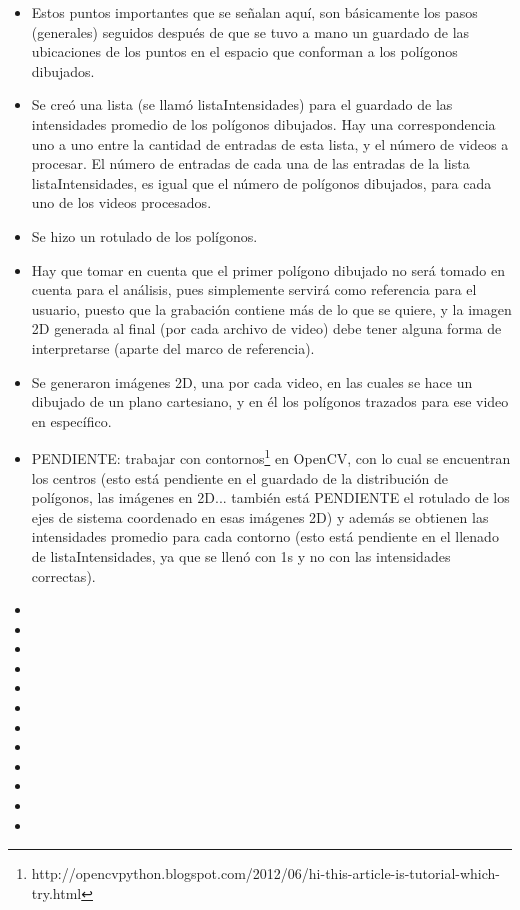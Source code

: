 \documentclass[letter]{article}
\begin{document}
\begin{itemize}
\item Estos puntos importantes que se señalan aquí, son básicamente los pasos (generales) seguidos después de que se tuvo a mano un guardado de las ubicaciones de los puntos en el espacio que conforman a los polígonos dibujados.
\item Se creó una lista (se llamó listaIntensidades) para el guardado de las intensidades promedio de los polígonos dibujados. Hay una correspondencia uno a uno entre la cantidad de entradas de esta lista, y el número de videos a procesar. El número de entradas de cada una de las entradas de la lista listaIntensidades, es igual que el número de polígonos dibujados, para cada uno de los videos procesados.
\item Se hizo un rotulado de los polígonos.
\item Hay que tomar en cuenta que el primer polígono dibujado no será tomado en cuenta para el análisis, pues simplemente servirá como referencia para el usuario, puesto que la grabación contiene más de lo que se quiere, y la imagen 2D generada al final (por cada archivo de video) debe tener alguna forma de interpretarse (aparte del marco de referencia).
\item Se generaron imágenes 2D, una por cada video, en las cuales se hace un dibujado de un plano cartesiano, y en él los polígonos trazados para ese video en específico.
\item PENDIENTE: trabajar con contornos\footnote{http://opencvpython.blogspot.com/2012/06/hi-this-article-is-tutorial-which-try.html} en OpenCV, con lo cual se encuentran los centros (esto está pendiente en el guardado de la distribución de polígonos, las imágenes en 2D... también está PENDIENTE el rotulado de los ejes de sistema coordenado en esas imágenes 2D) y además se obtienen las intensidades promedio para cada contorno (esto está pendiente en el llenado de listaIntensidades, ya que se llenó con 1s y no con las intensidades correctas).
\item 
\item 
\item 
\item 
\item 
\item 
\item 
\item 
\item 
\item 
\item 
\item 
\end{itemize}
\end{document}
